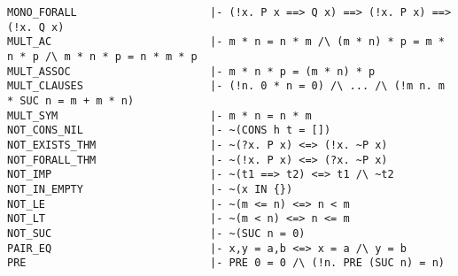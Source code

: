 \documentclass{llncs}
\begin{document}
\begin{verbatim}
MONO_FORALL                     |- (!x. P x ==> Q x) ==> (!x. P x) ==> (!x. Q x)
MULT_AC                         |- m * n = n * m /\ (m * n) * p = m * n * p /\ m * n * p = n * m * p
MULT_ASSOC                      |- m * n * p = (m * n) * p
MULT_CLAUSES                    |- (!n. 0 * n = 0) /\ ... /\ (!m n. m * SUC n = m + m * n)
MULT_SYM                        |- m * n = n * m
NOT_CONS_NIL                    |- ~(CONS h t = [])
NOT_EXISTS_THM                  |- ~(?x. P x) <=> (!x. ~P x)
NOT_FORALL_THM                  |- ~(!x. P x) <=> (?x. ~P x)
NOT_IMP                         |- ~(t1 ==> t2) <=> t1 /\ ~t2
NOT_IN_EMPTY                    |- ~(x IN {})
NOT_LE                          |- ~(m <= n) <=> n < m
NOT_LT                          |- ~(m < n) <=> n <= m
NOT_SUC                         |- ~(SUC n = 0)
PAIR_EQ                         |- x,y = a,b <=> x = a /\ y = b
PRE                             |- PRE 0 = 0 /\ (!n. PRE (SUC n) = n)
\end{verbatim}
\endgroup

\newpage
\end{document}
